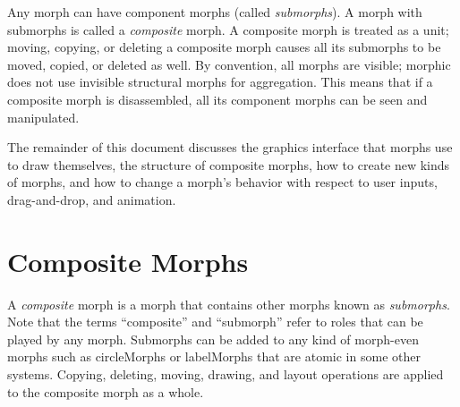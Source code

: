 \documentclass[letterpaper,10pt,english]{sphinxmanual}
\begin{document}
Any morph can have component morphs (called \emph{submorphs}). A morph with submorphs is called a \emph{composite} morph. A composite morph is treated as a unit; moving, copying, or deleting a composite morph causes all its submorphs to be moved, copied, or deleted as well. By convention, all morphs are visible; morphic does not use invisible structural morphs for aggregation. This means that if a composite morph is disassembled, all its component morphs can be seen and manipulated.

The remainder of this document discusses the graphics interface that morphs use to draw themselves, the structure of composite morphs, how to create new kinds of morphs, and how to change a morph's behavior with respect to user inputs, drag-and-drop, and animation.


\section{Composite Morphs}
\label{morphic:composite-morphs}
A \emph{composite} morph is a morph that contains other morphs known as \emph{submorphs}. Note that the terms ``composite'' and ``submorph'' refer to roles that can be played by any morph. Submorphs can be added to any kind of morph-even morphs such as circleMorphs or labelMorphs that are atomic in some other systems. Copying, deleting, moving, drawing, and layout operations are applied to the composite morph as a whole.
\end{document}
